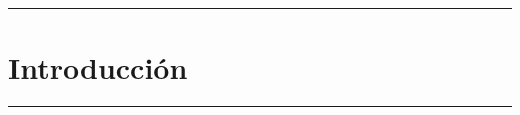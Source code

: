 
  \thispagestyle{empty}


    \begin{minipage}{0.85\textwidth}
    \end{minipage}%

    \vspace{14cm}
    \begin{minipage}{0.85\textwidth}
      \begin{center}
          \sffamily
          
          \rule{\textwidth}{0.2mm}
          { \sffamily \color{modalblue}%
        \chapter{  Introducción} 
    }
    
          
          \rule{\textwidth}{0.2mm}\\
      \end{center}
    \end{minipage}%
    


